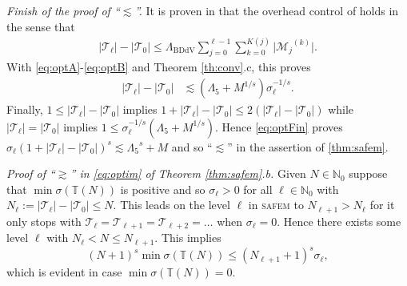 \documentclass{siamltex1213}
\begin{document}
\textit{Finish of the proof of ``$\lesssim$''.} 
	It is proven in \cite{CR09,safem2015} that the overhead control of \cite{BDD04,Stev08} holds in the sense that
	\begin{align}\label{eq:overheadClB}
		{\left\lvert {{\mathcal T_{\ell}}} \right\rvert}-{\left\lvert {{\mathcal T_{0}} } \right\rvert} \leq {\ensuremath{\Lambda_{\mathrm{BDdV}}}}
		 \sum_{j=0}^{\ell-1} \sum_{k=0}^{K(j)}\vert{\mathcal M_{j}}^{(k)}\vert.
	\end{align}
	With \eqref{eq:optA}-\eqref{eq:optB} and Theorem \ref{th:conv}.c,  this proves
	\begin{align}\label{eq:optFin}
		{\left\lvert {{\mathcal T_{\ell}}} \right\rvert}-{\left\lvert {{\mathcal T_{0}}} \right\rvert} &  
		\lesssim ({\ensuremath{\Lambda_{\mathrm{5}}}}+M^{1/s}) \sigma_\ell^{-1/s}.
	\end{align}
	Finally, $1\leq {\left\lvert {{\mathcal T_{\ell}}} \right\rvert}- {\left\lvert {{\mathcal T_{0}}} \right\rvert}$ implies $1+  {\left\lvert {{\mathcal T_{\ell}}} \right\rvert}- {\left\lvert {{\mathcal T_{0}}} \right\rvert} \leq 2( {\left\lvert {{\mathcal T_{\ell}}} \right\rvert}- {\left\lvert {{\mathcal T_{0}}} \right\rvert})$ while ${\left\lvert {{\mathcal T_{\ell}}} \right\rvert}={\left\lvert {{\mathcal T_{0}}} \right\rvert}$ implies $1\leq \sigma_\ell^{-1/s}({\ensuremath{\Lambda_{\mathrm{5}}}}+M^{1/s})$. Hence \eqref{eq:optFin} proves 
	$\sigma_\ell (1+ {\left\lvert {{\mathcal T_{\ell}}} \right\rvert}- {\left\lvert {{\mathcal T_{0}}} \right\rvert})^s \lesssim {\ensuremath{\Lambda_{\mathrm{5}}}}^s +M$ 
	and so ``$\lesssim$'' in the assertion of \cref{thm:safem}.
\qquad \endproof

\textit{Proof of ``$\gtrsim$''  in \eqref{eq:optim} of Theorem \ref{thm:safem}.b.}
Given $N\in{\mathbb{N}_0}$ suppose that $\min\sigma({\mathbb T\left(N\right)})$ is positive and so $\sigma_\ell>0$ for all 
$\ell\in{\mathbb{N}_0}$ with $N_\ell:= |{\mathcal{T}}_{\ell}|-|{\mathcal{T}}_0|\le N$. This leads on the level $\ell$ in {\textsc{safem}\xspace} to $N_{\ell+1}>N_\ell$ 
for it only stops with ${\mathcal{T}}_{\ell}={\mathcal{T}}_{\ell+1}={\mathcal{T}}_{\ell+2}=\dots$ when $\sigma_\ell=0$. Hence there exists some level $\ell$ with $N_\ell<N\le N_{\ell+1}$. This implies 
\begin{equation}\label{cceqN+1Sigmaell}
(N+1)^s\min\sigma({\mathbb T\left(N\right)})\le (N_{\ell+1}+1)^s \sigma_\ell,
\end{equation}
which is evident in case $\min\sigma({\mathbb T\left(N\right)})=0$. 
\end{document}
